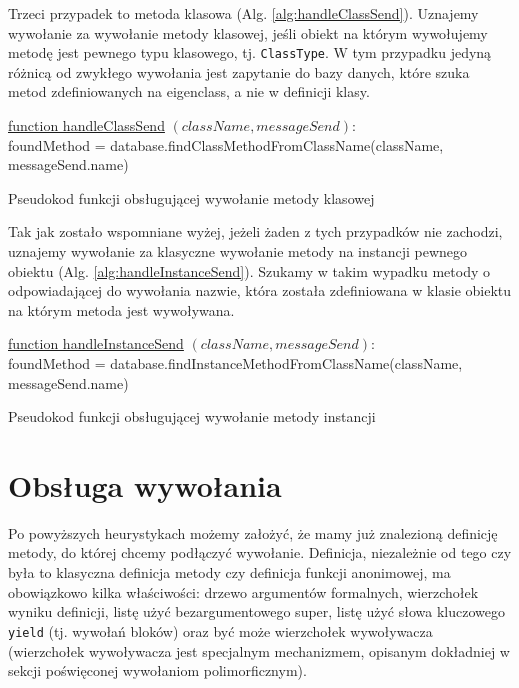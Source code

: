 \documentclass[shortabstract,mgr]{iithesis}
\newcommand{\algsize}{\small}
\begin{document}
Trzeci przypadek to metoda klasowa (Alg. \ref{alg:handleClassSend}). Uznajemy wywołanie za wywołanie metody klasowej, jeśli obiekt na którym wywołujemy metodę jest pewnego typu klasowego, tj. \texttt{ClassType}. W tym przypadku jedyną różnicą od zwykłego wywołania jest zapytanie do bazy danych, które szuka metod zdefiniowanych na eigenclass, a nie w definicji klasy.

\begin{algorithm}
    \algsize
    \underline{function handleClassSend} $(\mathit{className}, \mathit{messageSend})$:\\
    foundMethod = database.findClassMethodFromClassName(className, messageSend.name)\;
    \caption{Pseudokod funkcji obsługującej wywołanie metody klasowej}
    \label{alg:handleClassSend}
\end{algorithm}

Tak jak zostało wspomniane wyżej, jeżeli żaden z tych przypadków nie zachodzi, uznajemy wywołanie za klasyczne wywołanie metody na instancji pewnego obiektu (Alg. \ref{alg:handleInstanceSend}). Szukamy w takim wypadku metody o odpowiadającej do wywołania nazwie, która została zdefiniowana w klasie obiektu na którym metoda jest wywoływana.

\begin{algorithm}
    \algsize
    \underline{function handleInstanceSend} $(\mathit{className}, \mathit{messageSend})$:\\
    foundMethod = database.findInstanceMethodFromClassName(className, messageSend.name)\;
    \caption{Pseudokod funkcji obsługującej wywołanie metody instancji}
    \label{alg:handleInstanceSend}
\end{algorithm}

\section{Obsługa wywołania}

Po powyższych heurystykach możemy założyć, że mamy już znalezioną definicję metody, do której chcemy podłączyć wywołanie. Definicja, niezależnie od tego czy była to klasyczna definicja metody czy definicja funkcji anonimowej, ma obowiązkowo kilka właściwości: drzewo argumentów formalnych, wierzchołek wyniku definicji, listę użyć bezargumentowego super, listę użyć słowa kluczowego \texttt{yield} (tj. wywołań bloków) oraz być może wierzchołek wywoływacza (wierzchołek wywoływacza jest specjalnym mechanizmem, opisanym dokładniej w sekcji poświęconej wywołaniom polimorficznym).
\end{document}
